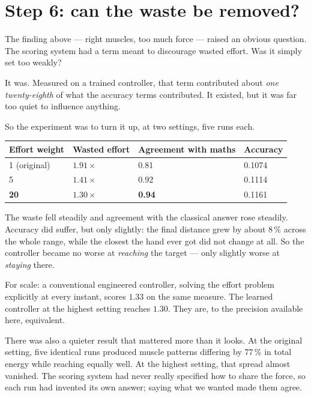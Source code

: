 \documentclass[11pt, a4paper]{article}
\begin{document}
\section{Step 6: can the waste be removed?}

The finding above --- right muscles, too much force --- raised an obvious
question. The scoring system had a term meant to discourage wasted effort. Was it
simply set too weakly?

It was. Measured on a trained controller, that term contributed about
\emph{one twenty-eighth} of what the accuracy terms contributed. It existed, but
it was far too quiet to influence anything.

So the experiment was to turn it up, at two settings, five runs each.

\begin{table}[h]
\centering
\begin{tabular}{@{} C{3.2cm} C{3.4cm} C{3.4cm} C{3.0cm} @{}}
\toprule
\textbf{Effort weight} & \textbf{Wasted effort} & \textbf{Agreement with maths} & \textbf{Accuracy} \\
 (original) & $1.91\times$ & 0.81 & 0.1074 \\
5 & $1.41\times$ & 0.92 & 0.1114 \\
\textbf{20} & $\mathbf{1.30\times}$ & \textbf{0.94} & 0.1161 \\
\bottomrule
\end{tabular}
\end{table}

The waste fell steadily and agreement with the classical answer rose steadily.
Accuracy did suffer, but only slightly: the final distance grew by about 8\,\%
across the whole range, while the closest the hand ever got did not change at
all. So the controller became no worse at \emph{reaching} the target --- only
slightly worse at \emph{staying} there.

For scale: a conventional engineered controller, solving the effort problem
explicitly at every instant, scores $1.33$ on the same measure. The learned
controller at the highest setting reaches $1.30$. They are, to the precision
available here, equivalent.

There was also a quieter result that mattered more than it looks. At the original
setting, five identical runs produced muscle patterns differing by 77\,\% in
total energy while reaching equally well. At the highest setting, that spread
almost vanished. The scoring system had never really specified how to share the
force, so each run had invented its own answer; saying what we wanted made them
agree.
\end{document}
